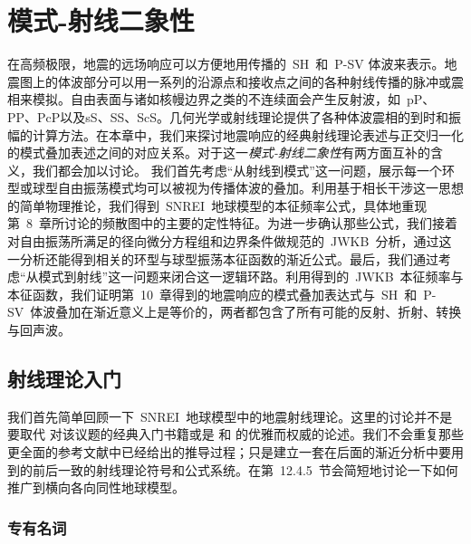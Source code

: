 \chapter{模式-射线二象性}
\label{chapter:duality}

在高频极限，地震的远场响应可以方便地用传播的~SH~和~P-SV 体波来表示。地震图上的体波部分可以用一系列的沿源点和接收点之间的各种射线传播的脉冲或震相来模拟。自由表面与诸如核幔边界之类的不连续面会产生反射波，如~pP、PP、PcP以及sS、SS、ScS。几何光学或射线理论提供了各种体波震相的到时和振幅的计算方法。在本章中，我们来探讨地震响应的经典射线理论表述与正交归一化的模式叠加表述之间的对应关系。对于这一{\em 模式-射线二象性\/}有两方面互补的含义，我们都会加以讨论。
%
%
我们首先考虑“从射线到模式”这一问题，展示每一个环型或球型自由振荡模式均可以被视为传播体波的叠加。利用基于相长干涉这一思想的简单物理推论，我们得到~SNREI~地球模型的本征频率公式，具体地重现第~8~章所讨论的频散图中的主要的定性特征。为进一步确认那些公式，我们接着对自由振荡所满足的径向微分方程组和边界条件做规范的~JWKB~分析，通过这一分析还能得到相关的环型与球型振荡本征函数的渐近公式。最后，我们通过考虑“从模式到射线”这一问题来闭合这一逻辑环路。利用得到的~JWKB~本征频率与本征函数，我们证明第~10~章得到的地震响应的模式叠加表达式与~SH~和~P-SV~体波叠加在渐近意义上是等价的，两者都包含了所有可能的反射、折射、转换与回声波。

\section{射线理论入门}
%
%

我们首先简单回顾一下~SNREI~地球模型中的地震射线理论。这里的讨论并不是要取代
\textcite{bullen63} 对该议题的经典入门书籍或是
\textcite{aki&richards80} 和 \textcite{ben-menahem&singh81}的优雅而权威的论述。我们不会重复那些更全面的参考文献中已经给出的推导过程；只是建立一套在后面的渐近分析中要用到的前后一致的射线理论符号和公式系统。在第~12.4.5~节会简短地讨论一下如何推广到横向各向同性地球模型。

\subsection{专有名词}

